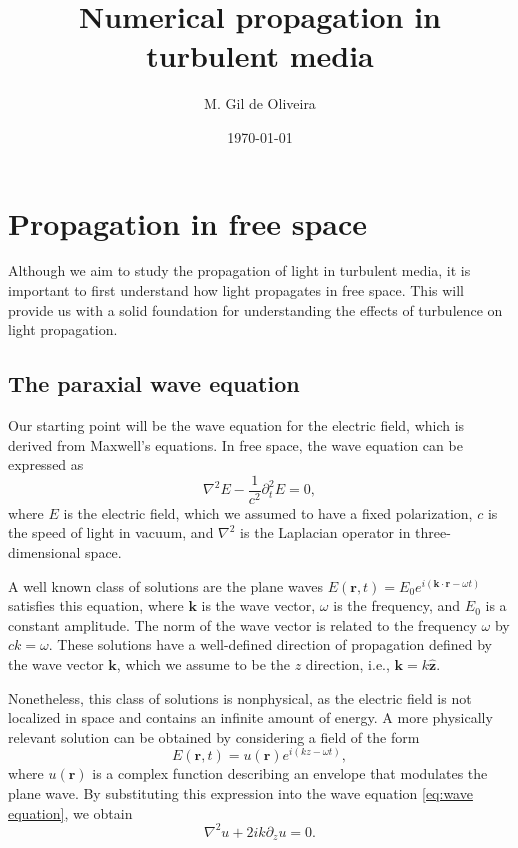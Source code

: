 \documentclass[openany,a4paper,oneside,11pt]{article}
\title{Numerical propagation in turbulent media}
\author{M. Gil de Oliveira}
\date{\today}
\begin{document}
\maketitle


\section{Propagation in free space}

Although we aim to study the propagation of light in turbulent media, it is important to first understand how light propagates in free space. This will provide us with a solid foundation for understanding the effects of turbulence on light propagation.

\subsection{The paraxial wave equation}

Our starting point will be the wave equation for the electric field, which is derived from Maxwell's equations. In free space, the wave equation can be expressed as
\begin{equation}
    \label{eq:wave equation}
    \nabla^2 E - \frac{1}{c^2} \partial_t^2 E = 0,
\end{equation}
where $E$ is the electric field, which we assumed to have a fixed polarization, $c$ is the speed of light in vacuum, and $\nabla^2$ is the Laplacian operator in three-dimensional space. 

A well known class of solutions are the plane waves $E(\mathbf{r}, t) = E_0 e^{i(\mathbf{k} \cdot \mathbf{r} - \omega t)}$ satisfies this equation, where $\mathbf{k}$ is the wave vector, $\omega$ is the frequency, and $E_0$ is a constant amplitude. The norm of the wave vector is related to the frequency $\omega$ by $ck = \omega$. These solutions have a well-defined direction of propagation defined by the wave vector $\mathbf{k}$, which we assume to be the $z$ direction, i.e., $\mathbf{k} = k \hat{\mathbf{z}}$.

Nonetheless, this class of solutions is nonphysical, as the electric field is not localized in space and contains an infinite amount of energy. A more physically relevant solution can be obtained by considering a field of the form
\begin{equation}
    E(\mathbf{r}, t) = u(\mathbf{r}) e^{i(kz - \omega t)},
\end{equation}
where $u(\mathbf{r})$ is a complex function describing an envelope that modulates the plane wave. By substituting this expression into the wave equation \eqref{eq:wave equation}, we obtain
\begin{equation}
    \nabla^2 u + 2ik \partial_z u= 0.
\end{equation}
\end{document}
